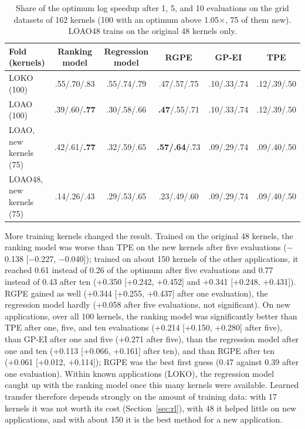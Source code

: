 \documentclass[10pt]{article}
\newcommand{\x}{\ensuremath{\times}}
\begin{document}
\begin{table}[t]
\centering
\caption{Share of the optimum log speedup after 1, 5, and 10 evaluations on the
grid datasets of 162 kernels (100 with an optimum above 1.05\x{}, 75 of them new).
LOAO48 trains on the original 48 kernels only.}
\label{tab:more}
\small
\setlength{\tabcolsep}{3.5pt}
\begin{tabular}{lccccc}
\toprule
Fold (kernels) & Ranking model & Regression model & RGPE & GP-EI & TPE \\
\midrule
LOKO (100) & .55/.70/.83 & .55/.74/.79 & .47/.57/.75 & .10/.33/.74 & .12/.39/.50 \\
LOAO (100) & .39/.60/\textbf{.77} & .30/.58/.66 & \textbf{.47}/.55/.71 & .10/.33/.74 & .12/.39/.50 \\
LOAO, new kernels (75) & .42/.61/\textbf{.77} & .32/.59/.65 & \textbf{.57/.64}/.73 & .09/.29/.74 & .09/.40/.50 \\
LOAO48, new kernels (75) & .14/.26/.43 & .29/.53/.65 & .23/.49/.60 & .09/.29/.74 & .09/.40/.50 \\
\bottomrule
\end{tabular}
\end{table}

More training kernels changed the result. Trained on the original 48 kernels,
the ranking model was worse than TPE on the new kernels after five evaluations
($-$0.138 [$-$0.227, $-$0.040]); trained on about 150 kernels of the other
applications, it reached 0.61 instead of 0.26 of the optimum after five
evaluations and 0.77 instead of 0.43 after ten (+0.350 [+0.242, +0.452] and
+0.341 [+0.248, +0.431]). RGPE gained as well (+0.344 [+0.255, +0.437] after one
evaluation), the regression model hardly (+0.058 after five evaluations, not
significant). On new applications, over all 100 kernels, the
ranking model was significantly better than TPE after one, five, and ten
evaluations (+0.214 [+0.150, +0.280] after five), than GP-EI after one and five
(+0.271 after five), than the regression model after one and ten (+0.113 [+0.066, +0.161]
after ten), and than RGPE after ten (+0.061 [+0.012, +0.114]); RGPE was the best
first guess (0.47 against 0.39 after one evaluation). Within known applications
(LOKO), the regression model caught up with the ranking model once this many
kernels were available. Learned transfer therefore depends strongly on the
amount of training data: with 17 kernels it was not worth its cost
(Section~\ref{sec:rl}), with 48 it helped little on new applications, and with
about 150 it is the best method for a new application.
\end{document}
